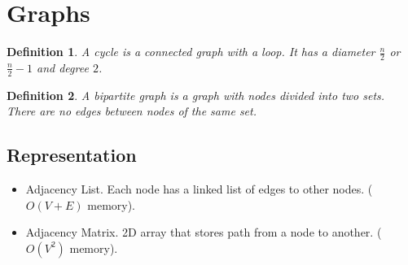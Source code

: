 \documentclass[10pt,landscape,a4paper]{article}
\newtheorem{definition}{Definition}[section]
\begin{document}
\begin{multicols*}{4}
\begin{itemize}
\end{itemize}

\section{Graphs}
\begin{definition}
    A cycle is a connected graph with a loop. It has a diameter $\frac{n}{2}$ or $\frac{n}{2}-1$ and degree $2$.
\end{definition}
\begin{definition}
    A bipartite graph is a graph with nodes divided into two sets. There are no edges between nodes of the same set.
\end{definition}

\subsection{Representation}
\begin{itemize}
    \item Adjacency List. Each node has a linked list of edges to other nodes. ($O(V+E)$ memory).
    \item Adjacency Matrix. 2D array that stores path from a node to another. ($O(V^2)$ memory).
\end{itemize}


\end{multicols*}
\end{document}
